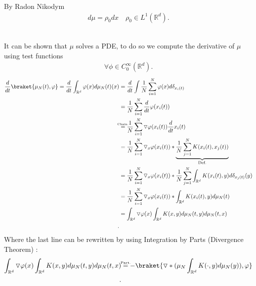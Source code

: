 \begin{corollary}
  By Radon Nikodym 
 \begin{align*}
  d\mu  = \rho_0 dx \quad \rho_0 \in  L^{1}(\mathbb{R}^{d} ) 
 .\end{align*}
\end{corollary}
\hspace{0mm}\\
It can be shown that $\mu $ solves a PDE, to do so we compute the derivative of $\mu $ using test functions
\begin{align*}
  \forall \phi \in  C_0^{\infty}(\mathbb{R}^{d} ) 
.\end{align*}
\begin{align*}
  \frac{d}{dt} \braket{\mu_{N}(t),\phi} = \frac{d}{dt} \int_{\mathbb{R}^{d} } \phi(x) d\mu_{N}(t)(x) &= \frac{d}{dt} \int \frac{1}{N} \sum_{i=1}^{N} \phi(x) d \delta_{x_i(t)} \\
                                                                                              &= \frac{1}{N} \sum_{i=1}^{N} \frac{d}{dt} \phi(x_i(t)) \\
                                                                                              &\myS{Chain.}{=} \frac{1}{N} \sum_{i=1}^{N}  \triangledown \phi(x_{i}(t)) \frac{d}{dt} x_i(t)\\
                                                                                              &= \frac{1}{N} \sum_{i=1}^{N} \triangledown_x \phi(x_i(t)) * \underbrace{\frac{1}{N} \sum_{j=1}^{N} K(x_i(t),x_j(t))}_{\text{Def.}}   \\
                                                                                              &=  \frac{1}{N} \sum_{i=1}^{N} \triangledown_x \phi(x_i(t))* \frac{1}{N} \sum_{j=1}^{N} \int_{\mathbb{R}^{d } }K(x_i(t),y) d\delta_{x_j(t)}(y) \\
                                                                                              &=  \frac{1}{N} \sum_{i=1}^{N} \triangledown_x \phi(x_i(t))*  \int_{\mathbb{R}^{d } }K(x_i(t),y) d\mu_{N}(t) \\
                                                                                              &= \int_{\mathbb{R}^{d} } \triangledown \phi(x) \int_{\mathbb{R}^{d } } K(x,y) d\mu_{N}(t,y) d\mu_N(t,x)  \\
.\end{align*}
Where the last line can be rewritten by using Integration by Parts (Divergence Theorem) :
\begin{align*}
  \int_{\mathbb{R}^{d} } \triangledown \phi(x) \int_{\mathbb{R}^{d } } K(x,y) d\mu_{N}(t,y) d\mu_N(t,x)  &\myS{Part.}{=} - \braket{\triangledown*(\mu_N \int_{\mathbb{R}^{d }} K(\cdot,y)d\mu_{N}(y)),\phi} \\
.\end{align*}
